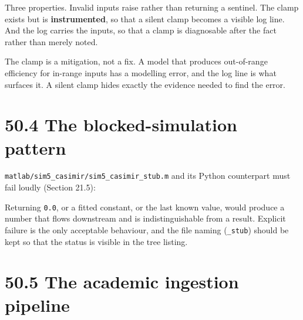 \documentclass[
  11pt]{report}
\newenvironment{Shaded}{}{}
\newcommand{\CommentTok}[1]{\textcolor[rgb]{0.38,0.63,0.69}{\textit{#1}}}
\newcommand{\ControlFlowTok}[1]{\textcolor[rgb]{0.00,0.44,0.13}{\textbf{#1}}}
\newcommand{\KeywordTok}[1]{\textcolor[rgb]{0.00,0.44,0.13}{\textbf{#1}}}
\newcommand{\NormalTok}[1]{#1}
\newcommand{\OperatorTok}[1]{\textcolor[rgb]{0.40,0.40,0.40}{#1}}
\newcommand{\StringTok}[1]{\textcolor[rgb]{0.25,0.44,0.63}{#1}}
\newcommand{\VariableTok}[1]{\textcolor[rgb]{0.10,0.09,0.49}{#1}}
\begin{document}
Three properties. Invalid inputs raise rather than returning a sentinel.
The clamp exists but is \textbf{instrumented}, so that a silent clamp
becomes a visible log line. And the log carries the inputs, so that a
clamp is diagnosable after the fact rather than merely noted.

The clamp is a mitigation, not a fix. A model that produces out-of-range
efficiency for in-range inputs has a modelling error, and the log line
is what surfaces it. A silent clamp hides exactly the evidence needed to
find the error.

\hypertarget{the-blocked-simulation-pattern}{%
\section{50.4 The blocked-simulation
pattern}\label{the-blocked-simulation-pattern}}

\texttt{matlab/sim5\_casimir/sim5\_casimir\_stub.m} and its Python
counterpart must fail loudly (Section 21.5):

\begin{Shaded}
\end{Shaded}

Returning \texttt{0.0}, or a fitted constant, or the last known value,
would produce a number that flows downstream and is indistinguishable
from a result. Explicit failure is the only acceptable behaviour, and
the file naming (\texttt{\_stub}) should be kept so that the status is
visible in the tree listing.

\hypertarget{the-academic-ingestion-pipeline}{%
\section{50.5 The academic ingestion
pipeline}\label{the-academic-ingestion-pipeline}}
\end{document}
